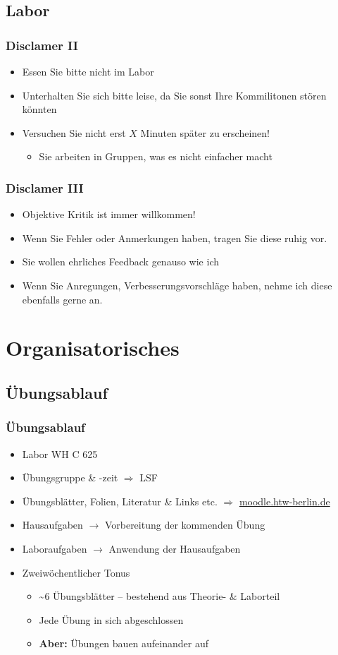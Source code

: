 \documentclass[xcolor=dvipsnames,aspectratio=169]{beamer}
\begin{document}
\subsection{Labor}
\begin{frame}
	\frametitle{Disclamer II}
	\begin{itemize}
		\item Essen Sie bitte nicht im Labor
		\item Unterhalten Sie sich bitte leise, da Sie sonst Ihre Kommilitonen stören könnten
		\item Versuchen Sie nicht erst $X$ Minuten später zu erscheinen!
		\begin{itemize}
			\item Sie arbeiten in Gruppen, was es nicht einfacher macht
		\end{itemize}
	\end{itemize}
\end{frame}

\begin{frame}
	\frametitle{Disclamer III}
	\begin{itemize}
		\item Objektive Kritik ist immer willkommen!
		\item Wenn Sie Fehler oder Anmerkungen haben, tragen Sie diese ruhig vor.
		\item Sie wollen ehrliches Feedback genauso wie ich
		\item Wenn Sie Anregungen, Verbesserungsvorschläge haben, nehme ich diese ebenfalls gerne an.
	\end{itemize}
\end{frame}

\section{Organisatorisches}
\subsection{Übungsablauf}
\begin{frame}
	\frametitle{Übungsablauf}
	\begin{itemize}
		\item Labor WH C 625
		\item Übungsgruppe \& -zeit $\Rightarrow$ LSF
		\item Übungsblätter, Folien, Literatur \& Links etc. $\Rightarrow$ \url{moodle.htw-berlin.de}
		\item Hausaufgaben $\rightarrow$ Vorbereitung der kommenden Übung
		\item Laboraufgaben $\rightarrow$ Anwendung der Hausaufgaben
		\item Zweiwöchentlicher Tonus 
		\begin{itemize}
			\item \textasciitilde 6 Übungsblätter -- bestehend aus Theorie- \& Laborteil
			\item Jede Übung in sich abgeschlossen
			\item \textbf{Aber:} Übungen bauen aufeinander auf
		\end{itemize}
	\end{itemize}
\end{frame}
\end{document}
